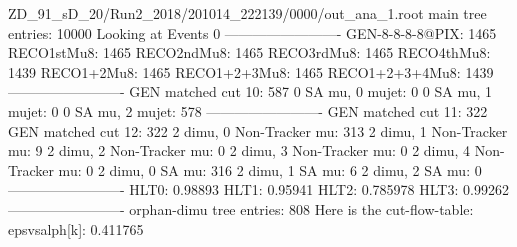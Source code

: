 ZD_91_sD_20/Run2_2018/201014_222139/0000/out_ana_1.root
main tree entries: 10000
Looking at Events 0
-------------------------
GEN-8-8-8-8@PIX: 1465
RECO1stMu8: 1465
RECO2ndMu8: 1465
RECO3rdMu8: 1465
RECO4thMu8: 1439
RECO1+2Mu8: 1465
RECO1+2+3Mu8: 1465
RECO1+2+3+4Mu8: 1439
-------------------------
GEN matched cut 10: 587
0 SA mu, 0 mujet: 0
0 SA mu, 1 mujet: 0
0 SA mu, 2 mujet: 578
-------------------------
GEN matched cut 11: 322
GEN matched cut 12: 322
2 dimu, 0 Non-Tracker mu: 313
2 dimu, 1 Non-Tracker mu: 9
2 dimu, 2 Non-Tracker mu: 0
2 dimu, 3 Non-Tracker mu: 0
2 dimu, 4 Non-Tracker mu: 0
2 dimu, 0 SA mu: 316
2 dimu, 1 SA mu: 6
2 dimu, 2 SA mu: 0
-------------------------
HLT0: 0.98893
HLT1: 0.95941
HLT2: 0.785978
HLT3: 0.99262
-------------------------
orphan-dimu tree entries: 808
Here is the cut-flow-table:
epsvsalph[k]: 0.411765
        
